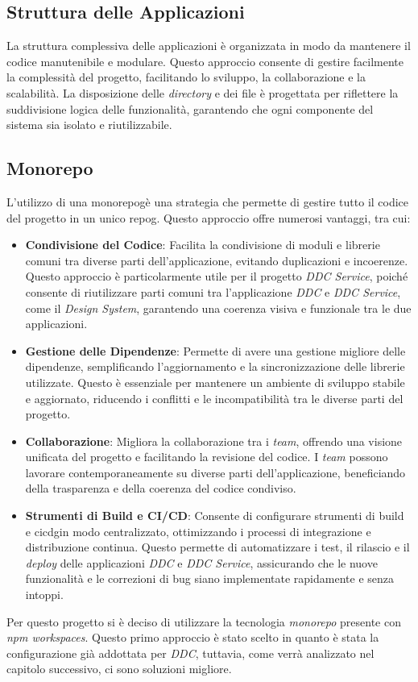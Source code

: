 \subsection{Struttura delle Applicazioni}
\label{subsec:struttura_applicazioni}

La struttura complessiva delle applicazioni è organizzata in modo da mantenere il codice manutenibile e modulare.
Questo approccio consente di gestire facilmente la complessità del progetto, facilitando lo sviluppo, la collaborazione e la scalabilità. 
La disposizione delle \textit{directory} e dei file è progettata per riflettere la suddivisione logica delle funzionalità, garantendo che ogni componente del sistema sia isolato e riutilizzabile.


\subsection{Monorepo}
L'utilizzo di una \gls{monorepog}\glox è una strategia che permette di gestire tutto il codice del progetto in un unico \gls{repog}\glox.
Questo approccio offre numerosi vantaggi, tra cui:

\begin{itemize}
    \item \textbf{Condivisione del Codice}: Facilita la condivisione di moduli e librerie comuni tra diverse parti dell'applicazione, evitando duplicazioni e incoerenze.
    Questo approccio è particolarmente utile per il progetto \textit{DDC Service}, poiché consente di riutilizzare parti comuni tra l'applicazione \textit{DDC} e \textit{DDC Service}, come il \textit{Design System}, garantendo una coerenza visiva e funzionale tra le due applicazioni.
    \item \textbf{Gestione delle Dipendenze}: Permette di avere una gestione migliore delle dipendenze, semplificando l'aggiornamento e la sincronizzazione delle librerie utilizzate.
    Questo è essenziale per mantenere un ambiente di sviluppo stabile e aggiornato, riducendo i conflitti e le incompatibilità tra le diverse parti del progetto.
    \item \textbf{Collaborazione}: Migliora la collaborazione tra i \textit{team}, offrendo una visione unificata del progetto e facilitando la revisione del codice.
    I \textit{team} possono lavorare contemporaneamente su diverse parti dell'applicazione, beneficiando della trasparenza e della coerenza del codice condiviso.
    \item \textbf{Strumenti di Build e CI/CD}: Consente di configurare strumenti di build e \gls{cicdg}\glox in modo centralizzato, ottimizzando i processi di integrazione e distribuzione continua.
    Questo permette di automatizzare i test, il rilascio e il \textit{deploy} delle applicazioni \textit{DDC} e \textit{DDC Service}, assicurando che le nuove funzionalità e le correzioni di bug siano implementate rapidamente e senza intoppi.
\end{itemize}
Per questo progetto si è deciso di utilizzare la tecnologia \textit{monorepo} presente con \textit{npm workspaces}.
Questo primo approccio è stato scelto in quanto è stata la configurazione già addottata per \textit{DDC}, tuttavia, come verrà analizzato nel capitolo successivo, ci sono soluzioni migliore.

